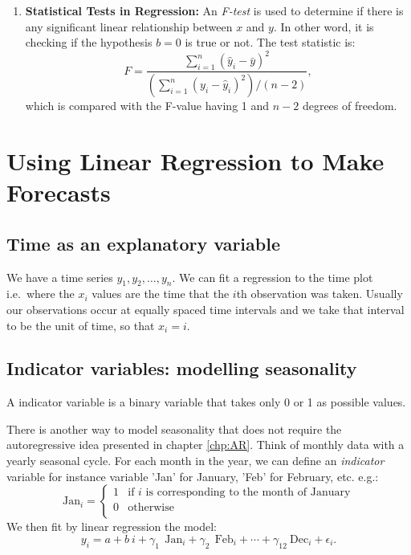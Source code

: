 \documentclass[a4paper,11pt,oneside,onecolumn]{book}
\begin{document}
\begin{enumerate}
\item {\bf Statistical Tests in Regression:} An {\it F-test} is used to
 determine if there is any significant linear relationship between
 $x$ and $y$. In other word, it is checking if the hypothesis $b=0$ is true or not.  The test statistic is:
 \[ F = \frac{\sum_{i=1}^n (\hat{y}_i - \bar{y})^2}{\left(
 \sum_{i=1}^n (y_i - \hat{y}_i)^2 \right) / (n-2)}, \]
 which is compared with the F-value having 1 and $n-2$ degrees of
 freedom.

\end{enumerate}

\section{Using Linear Regression to Make Forecasts}


\subsection{Time as an explanatory variable}

We have a time series $y_1,y_2,\ldots,y_n$. We can fit a
regression to the time plot i.e.\ where the $x_i$ values are the
time that the $i$th observation was taken. Usually our
observations occur at equally spaced time intervals and we take
that interval to be the unit of time, so that  $x_i = i$.


\subsection{Indicator variables: modelling seasonality}

\begin{definition}
A indicator variable is a binary variable that takes only 0 or 1 as possible values.
\end{definition}

There is another way to model seasonality that does not require the
autoregressive idea presented in chapter \ref{chp:AR}. Think of monthly data with a yearly seasonal
cycle. For each month in the year, we can define an \textit{indicator}
variable for instance variable  'Jan' for January, 'Feb' for February, etc. e.g.:
$$
\text{Jan}_i=
\left\lbrace 
\begin{array}{ll}
1&\text{if $i$ is corresponding to the month of January}\\
0&\text{otherwise} \\
\end{array}\right.
$$ 
We then fit by linear
regression the model:
\[ y_i = a + b\ i + \gamma_1\ \ \text{Jan}_i + \gamma_2\ \ \text{Feb}_i + \cdots
+ \gamma_{12}\  \text{Dec}_i + \epsilon_i. \]
\end{document}
